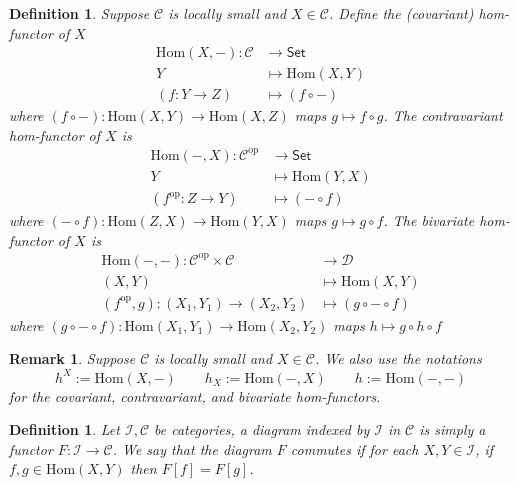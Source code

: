 \documentclass[10pt]{book}
\theoremstyle{bookplain}
\theoremstyle{bookdefinition}
\newtheorem{definition}[theorem]{Definition}
\theoremstyle{bookremark}
\newtheorem{remark}[theorem]{Remark}
\begin{document}
\begin{definition}
    \label{def:hom-functors}
    Suppose $\mathscr{C}$ is locally small and $X\in\mathscr{C}$. Define the \textit{(covariant) hom-functor} of $X$
    \[\begin{aligned}
    \mathrm{Hom}(X,-):\mathscr{C}&\rightarrow \mathsf{Set}\\
        Y&\mapsto \mathrm{Hom}(X,Y)\\
        (f:Y\rightarrow Z)&\mapsto (f\circ -)
    \end{aligned}
    \] 
    where $(f\circ -):\mathrm{Hom}(X,Y)\rightarrow \mathrm{Hom}(X,Z)$ maps $g\mapsto f\circ g$. The \textit{contravariant hom-functor} of $X$ is 
    \[
    \begin{aligned}
    \mathrm{Hom}(-,X):\mathscr{C}^{\mathrm{op}}&\rightarrow \mathsf{Set}\\
        Y&\mapsto \mathrm{Hom}(Y,X)\\
        (f^{\mathrm{op}}:Z\rightarrow Y)&\mapsto (-\circ f)
    \end{aligned}
    \] 
    where $(-\circ f):\mathrm{Hom}(Z,X)\rightarrow \mathrm{Hom}(Y,X)$ maps $g\mapsto g\circ f$. The \textit{bivariate hom-functor} of $X$ is 
    \[\begin{aligned}
        \mathrm{Hom}(-,-):\mathscr{C}^{\mathrm{op}}\times \mathscr{C}&\rightarrow \mathscr{D}\\
         (X,Y)&\mapsto \mathrm{Hom}(X,Y)\\
         (f^{\mathrm{op}},g):(X_1,Y_1)\rightarrow (X_2,Y_2)&\mapsto (g\circ -\circ f)
    \end{aligned}\]
    where 
    $(g\circ -\circ f):\mathrm{Hom}(X_1,Y_1)\rightarrow \mathrm{Hom}(X_2,Y_2)$ maps $h\mapsto g\circ h\circ f$
\end{definition}

\begin{remark}Suppose $\mathscr{C}$ is locally small and $X\in\mathscr{C}$. We also use the notations
    \[h^X:=\mathrm{Hom}(X,-)\qquad h_X:=\mathrm{Hom}(-,X)\qquad h:=\mathrm{Hom}(-,-)\]
    for the covariant, contravariant, and bivariate hom-functors. 
\end{remark}

\begin{definition}Let $\mathscr{I},\mathscr{C}$ be categories, a \textit{diagram} indexed by $\mathscr{I}$ in $\mathscr{C}$ is simply a functor $F:\mathscr{I}\rightarrow \mathscr{C}$. We say that the diagram $F$ \textit{commutes} if for each $X,Y\in\mathscr{I}$, if $f,g\in\mathrm{Hom}(X,Y)$ then $F[f]=F[g]$. 
\end{definition}
\end{document}
